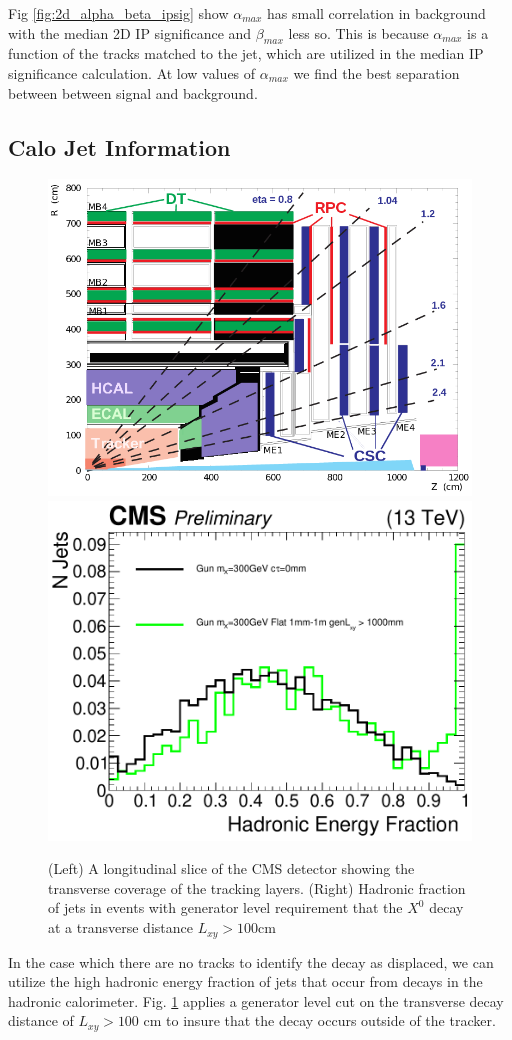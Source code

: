 Fig \ref{fig:2d_alpha_beta_ipsig} show $\alpha_{max}$ has small correlation in background with the median 2D IP significance
 and $\beta_{max}$ less so. This is because $\alpha_{max}$ is a function of the tracks matched to the jet, 
which are utilized in the median IP significance calculation. At low values of $\alpha_{max}$ we find the best separation
between between signal and background.


\subsection{Calo Jet Information}

\begin{figure}
\begin{center}
\includegraphics[width=.45\textwidth]{figures/an_jetid/DIAGRAMS/cms_slice}
\includegraphics[width=.45\textwidth]{figures/an_jetid/VTX_MATCH_IP/GUN_hadronicFraction}
\end{center}
\caption{(Left) A longitudinal slice of the CMS detector showing the transverse coverage of the tracking layers. (Right) Hadronic fraction of jets in events with generator level requirement that the $X^{0}$ decay at a transverse distance
$L_{xy} > 100$cm}
\label{fig:hadronicFraction}
\end{figure}

In the case which there are no tracks to identify the decay as displaced, we can utilize the high hadronic energy fraction
of jets that occur from decays in the hadronic calorimeter. Fig. \ref{fig:hadronicFraction} applies a generator level
cut on the transverse decay distance of $L_{xy} > 100$ cm to insure that the decay occurs outside of the tracker.
